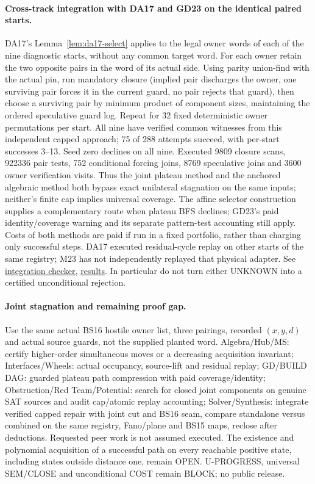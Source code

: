 \documentclass[11pt]{article}
\begin{document}
\paragraph{Cross-track integration with DA17 and GD23 on the identical paired starts.}
DA17's Lemma~\ref{lem:da17-select} applies to the legal owner words of each of the nine diagnostic starts, without any common target word. For each owner retain the two opposite pairs in the word of its actual side. Using parity union-find with the actual pin, run mandatory closure (implied pair discharges the owner, one surviving pair forces it in the current guard, no pair rejects that guard), then choose a surviving pair by minimum product of component sizes, maintaining the ordered speculative guard log. Repeat for 32 fixed deterministic owner permutations per start. All nine have verified common witnesses from this independent capped approach; 75 of 288 attempts succeed, with per-start successes 3--13. Seed zero declines on all nine. Executed 9809 closure scans, 922336 pair tests, 752 conditional forcing joins, 8769 speculative joins and 3600 owner verification visits. Thus the joint plateau method and the anchored algebraic method both bypass exact unilateral stagnation on the same inputs; neither's finite cap implies universal coverage. The affine selector construction supplies a complementary route when plateau BFS declines; GD23's paid identity/coverage warning and its separate pattern-test accounting still apply. Costs of both methods are paid if run in a fixed portfolio, rather than charging only successful steps. DA17 executed residual-cycle replay on other starts of the same registry; M23 has not independently replayed that physical adapter. See \href{https://github.com/j15marti/pnp/commit/fc4588e250d46243209b4e26427d29cb78a5143f}{integration checker}, \href{https://github.com/j15marti/pnp/commit/f968c9c169dfd5c04d804586e9951053a2cb2fb2}{results}. In particular do not turn either UNKNOWN into a certified unconditional rejection.

\paragraph{Joint stagnation and remaining proof gap.}
Use the same actual BS16 hostile owner list, three pairings, recorded $(x,y,d)$ and actual source guards, not the supplied planted word. Algebra/Hub/MS: certify higher-order simultaneous moves or a decreasing acquisition invariant; Interfaces/Wheels: actual occupancy, source-lift and residual replay; GD/BUILD DAG: guarded plateau path compression with paid coverage/identity; Obstruction/Red Team/Potential: search for closed joint components on genuine SAT sources and audit cap/atomic replay accounting; Solver/Synthesis: integrate verified capped repair with joint cut and BS16 seam, compare standalone versus combined on the same registry, Fano/plane and BS15 maps, reclose after deductions. Requested peer work is not assumed executed. The existence and polynomial acquisition of a successful path on every reachable positive state, including states outside distance one, remain OPEN. U-PROGRESS, universal SEM/CLOSE and unconditional COST remain BLOCK; no public release.
\end{document}
